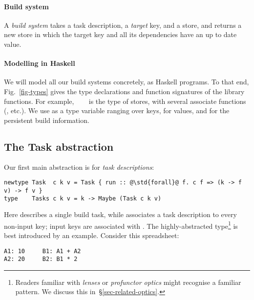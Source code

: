 \vspace{-2mm}
\paragraph{Build system} A \emph{build system} takes a task description, a
\emph{target} key, and a store, and returns a new store in which the target key
and all its dependencies have an up to date value.

\vspace{-2mm}
\paragraph{Modelling in Haskell} We will model all our build systems concretely,
as Haskell programs. To that end, Fig.~\ref{fig-types} gives the type
declarations and function signatures of the library functions. For example,
~~~ is the type of stores, with several associate
functions (, etc.). We use  as a type
variable ranging over keys,  for values, and  for the persistent
build information.

\subsection{The Task abstraction}\label{sec-task}


Our first main abstraction is for \emph{task descriptions}:
\begin{verbatim}
newtype Task  c k v = Task { run :: @\std{forall}@ f. c f => (k -> f v) -> f v }
type    Tasks c k v = k -> Maybe (Task c k v)
\end{verbatim}

\noindent
Here  describes a single build task, while  associates a
task description to every non-input key; input keys are associated with
. The highly-abstracted type\footnote{Readers familiar with
\emph{lenses} or \emph{profunctor optics} might recognise a familiar pattern.
We discuss this in~\S\ref{sec-related-optics}.}  is best introduced by
an example. Consider this \Excel spreadsheet:

\vspace{1mm}
\begin{verbatim}
A1: 10     B1: A1 + A2
A2: 20     B2: B1 * 2
\end{verbatim}
\vspace{1mm}

